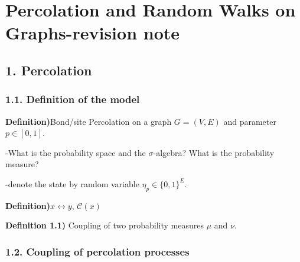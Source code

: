\documentclass[10pt,a4paper]{report}
\begin{document}
\newcommand{\thm}{\textbf{Theorem)}}
\newcommand{\thmnum}[1]{\textbf{Theorem #1)}}
\newcommand{\defi}{\textbf{Definition)}}
\newcommand{\definum}[1]{\textbf{Definition #1)}}
\newcommand{\lem}{\textbf{Lemma)}}
\newcommand{\lemnum}[1]{\textbf{Lemma #1)}}
\newcommand{\prop}{\textbf{Proposition)}}
\newcommand{\propnum}[1]{\textbf{Proposition #1)}}
\newcommand{\cor}{\textbf{Corollary)}}
\newcommand{\cornum}[1]{\textbf{Corollary #1)}}
\newcommand{\pf}{\textbf{proof) }}


\newcommand{\lap}{\triangle} %
\newcommand{\s}{\vspace{10pt}}
\newcommand{\bull}{$\bullet$}
\newcommand{\sta}{$\star$}
\newcommand{\reals}{\mathbb{R}}

\newcommand{\eop}{\hfill  \textsl{(End of proof)} $\square$} %

\newcommand{\intN}{\mathbb{Z}_N}
\newcommand{\norms}[2]{\parallel #1 \parallel_{#2}}
\newcommand{\avg}{\mathbb{E}}
\newcommand{\prob}{\mathbb{P}}
\newcommand{\borel}{\mathscr{B}}
\newcommand{\boxx}{\mathscr{B}}

\setlength\parindent{0pt}
\noindent

\chapter*{Percolation and Random Walks on Graphs-revision note}
\s

\section*{1. Percolation}

\subsection*{1.1. Definition of the model}

\defi Bond/site Percolation on a graph $G=(V,E)$ and parameter $p\in [0,1]$.

-What is the probability space and the $\sigma$-algebra? What is the probability measure?

-denote the state by random variable $\eta_p \in \{0,1\}^E$.
\s

\defi $x \leftrightarrow y$, $\mathscr{C}(x)$
\s

\definum{1.1} Coupling of two probability measures $\mu$ and $\nu$.
\s

\subsection*{1.2. Coupling of percolation processes}
\end{document}
